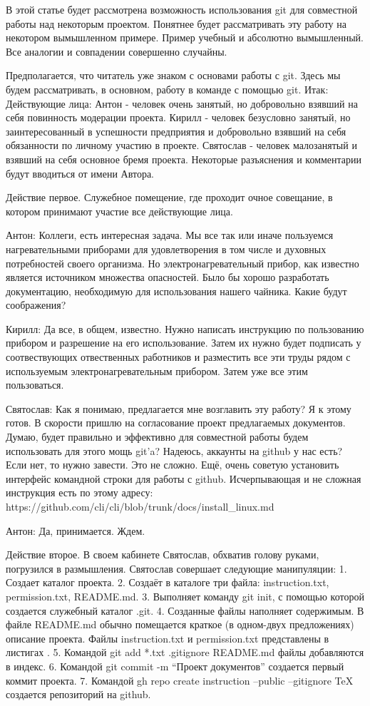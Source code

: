 В этой статье будет рассмотрена возможность использования git для совместной работы над 
некоторым проектом. Понятнее будет рассматривать эту работу на некотором вымышленном примере. 
Пример учебный и абсолютно вымышленный. Все аналогии и совпадении совершенно случайны.

Предполагается, что читатель уже знаком с основами работы с git. Здесь мы будем рассматривать,
в основном, работу в команде с помощью git.
Итак:
Действующие лица:
Антон - человек очень занятый, но добровольно взявший на себя повинность модерации проекта.
Кирилл - человек безусловно занятый, но заинтересованный в успешности предприятия и добровольно
взявший на себя обязанности по личному участию в проекте.
Святослав - человек малозанятый и взявший на себя основное бремя проекта.
Некоторые разъяснения и комментарии будут вводиться от имени Автора.

Действие первое. 
Служебное помещение, где проходит очное совещание, в котором принимают участие все действующие лица.

Антон: Коллеги, есть интересная задача. Мы все так или иначе пользуемся нагревательными приборами
для удовлетворения в том числе и духовных потребностей своего организма. Но электронагревательный 
прибор, как известно является источником множества опасностей. Было бы хорошо разработать
документацию, необходимую для использования нашего чайника. Какие будут соображения?

Кирилл: Да все, в общем, известно. Нужно написать инструкцию по пользованию прибором и разрешение
на его использование. 
Затем их нужно будет подписать у соотвествующих отвественных работников и разместить все эти труды
рядом с используемым электронагревательным прибором. Затем уже все этим пользоваться. 

Святослав: Как я понимаю, предлагается мне возглавить эту работу? Я к этому готов. В скорости
пришлю на согласование проект предлагаемых документов. Думаю, будет правильно и эффективно
для совместной работы будем использовать для этого мощь git'a? Надеюсь, аккаунты на github у нас есть?
Если нет, то нужно завести. Это не сложно. Ещё, очень советую установить интерфейс командной
строки для работы с github. Исчерпывающая и не сложная инструкция есть по этому адресу:
https://github.com/cli/cli/blob/trunk/docs/install\_linux.md

Антон: Да, принимается. Ждем.

Действие второе.
В своем кабинете Святослав, обхватив голову руками, погрузился в размышления.
Святослав совершает следующие манипуляции:
1. Создает каталог проекта.
2. Создаёт в каталоге три файла: instruction.txt, permission.txt, README.md.
3. Выполняет команду git init, с помощью которой создается служебный каталог .git.
4. Созданные файлы наполняет содержимым. В файле README.md обычно помещается краткое (в одном-двух
предложениях) описание проекта. Файлы instruction.txt и permission.txt представлены в листигах .
5. Командой git add *.txt .gitignore README.md файлы добавляются в индекс.
6. Командой git commit -m ``Проект документов'' создается первый коммит проекта.
7. Командой
 gh repo create instruction --public --gitignore TeX
	создается репозиторий на github.

